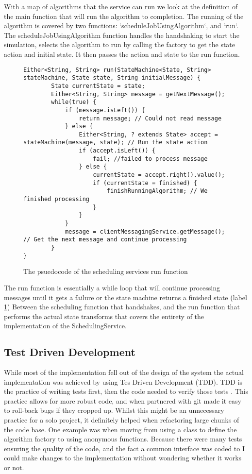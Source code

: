 \documentclass[12pt, letterpaper]{article}
\begin{document}
\newline
With a map of algorithms that the service can run we look at the definition of the main function that will run the algorithm to completion.
The running of the algorithm is covered by two functions: `scheduleJobUsingAlgorithm`, and `run`.
The scheduleJobUsingAlgorithm function handles the handshaking to start the simulation, selects the algorithm to run by calling the factory to get the state action and initial state.
It then passes the action and state to the run function.
\newline

\begin{figure}[ht!]
\begin{lstlisting}
Either<String, String> run(StateMachine<State, String> stateMachine, State state, String initialMessage) {
        State currentState = state;
        Either<String, String> message = getNextMessage();
        while(true) {
            if (message.isLeft()) {
                return message; // Could not read message
            } else {
                Either<String, ? extends State> accept = stateMachine(message, state); // Run the state action
                if (accept.isLeft()) {
                    fail; //failed to process message
                } else {
                    currentState = accept.right().value();
                    if (currentState = finished) { 
                        finishRunningAlgorithm; // We finished processing
                    }
                }
            }
            message = clientMessagingService.getMessage(); // Get the next message and continue processing
        }
}
\end{lstlisting}
\label{run_psuedocode}
\caption{The psuedocode of the scheduling services run function}
\end{figure}
The run function is essentially a while loop that will continue processing messages until it gets a failure or the state machine returns a finished state (label \ref{run_psuedocode})
Between the scheduling function that handshakes, and the run function that performs the actual state transforms that covers the entirety of the implementation of the SchedulingService.
\subsection*{Test Driven Development}
While most of the implementation fell out of the design of the system the actual implementation was achieved by using Tes Driven Development (TDD).
TDD is the practice of writing tests first, then the code needed to verify those tests \cite{beck_2015}.
This practice allows for more robust code, and when partnered with git made it easy to roll-back bugs if they cropped up. 
Whilst this might be an unnecessary practice for a solo project, it definitely helped when refactoring large chunks of the code base.
One example was when moving from using a class to define the algorithm factory to using anonymous functions. 
Because there were many tests ensuring the quality of the code, and the fact a common interface was coded to I could make changes to the implementation without wondering whether it works or not.


\end{document}

